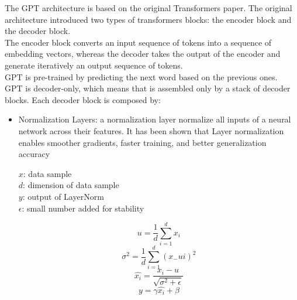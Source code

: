 The GPT architecture is based on the original Transformers paper. The original architecture introduced two types of transformers blocks: the encoder block and the decoder block. \\
The encoder block converts an input sequence of tokens into a sequence of embedding vectors, whereas the decoder takes the output of the encoder and generate iteratively an output sequence of tokens. \\
GPT is pre-trained by predicting the next word based on the previous ones. \\
GPT is decoder-only, which means that is assembled only by a stack of decoder blocks. Each decoder block is composed by:
\begin{itemize}
    \item Normalization Layers: a normalization layer \cite{ba2016layer} normalize all inputs of a neural network across their features. It has been shown that Layer normalization enables smoother gradients, faster training, and better generalization accuracy \cite{xu2019understanding}

    $x$: data sample \\
    $d$: dimension of data sample \\
    $y$: output of LayerNorm \\
    $\epsilon$: small number added for stability

    \begin{equation*}
        u = \frac{1}{d}\sum_{i=1}^{d}x_i 
    \end{equation*}
    \begin{equation*}
        \sigma^2 = \frac{1}{d}\sum_{i=1}^{d}(x_ - ui)^2
    \end{equation*}
    \begin{equation*}
        \hat{x_i} = \frac{x_i - u}{\sqrt{\sigma^2 + \epsilon}}
    \end{equation*}
    \begin{equation*}
        y = \gamma\hat{x_i} + \beta
    \end{equation*}


\end{itemize}
